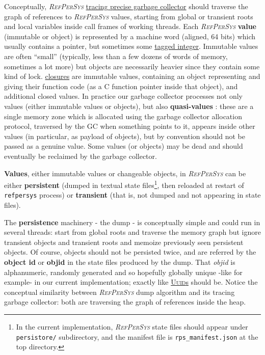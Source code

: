 \documentclass{IEEEtran}
\newcommand{\RefPerSys}{{\textit{\textsc{RefPerSys}}}}
\begin{document}
Conceptually, {\RefPerSys}
\href{https://en.wikipedia.org/wiki/Tracing_garbage_collection}{tracing
  precise garbage collector} should traverse the graph of references
to {\RefPerSys} values, starting from global or transient roots and
local variables inside call frames of working threads. Each
{\RefPerSys} \textbf{value}  (immutable or object) is
represented by a machine word (aligned, 64 bits) which usually
contains a pointer, but sometimes some
\href{https://en.wikipedia.org/wiki/Tagged\_pointer}{tagged integer}.
Immutable values are often ``small'' (typically, less than a few dozens of words of memory, sometimes a lot more) but
objects are necessarily heavier since they contain some kind of
lock. \href{https://en.wikipedia.org/wiki/Closure\_(computer_programming)}{closures}
are immutable values, containing an object representing and giving
their function code (as a C function pointer inside that object), and
additional closed values. In practice our garbage collector processes
not only values (either immutable values or objects), but also
\textbf{quasi-values} : these are a single memory
zone which is allocated using the garbage collector allocation
protocol, traversed by the GC when something points to it, appears
inside other values (in particular, as payload  of objects), but by
convention should not be passed as a genuine value.
Some values (or objects) may be dead and should eventually be reclaimed by the
garbage collector.

\textbf{Values}, either immutable values or changeable objects, in
       {\RefPerSys} can be either \textbf{persistent} (dumped in
       textual state files\footnote{In the current implementation,
       {\RefPerSys} state files should appear under
       \texttt{persistore/} subdirectory, and the manifest file is
       \texttt{rps\_manifest.json} at the top directory.}, then
       reloaded at restart of \texttt{refpersys} process) or
       \textbf{transient} (that is, not dumped and not appearing in
       state files).

The \textbf{persistence} machinery - the dump - is conceptually simple
and could run in several threads: start from global roots and traverse
the memory graph but ignore transient objects and transient roots and
memoize previously seen persistent objects. Of course, objects should
not be persisted twice, and are referred by the \textbf{object id} or
\textbf{objid} in the state files produced by the dump. That
\textit{objid}  is alphanumeric, randomly generated and so hopefully
globally unique -like {}
for example- in our current implementation; exactly like
\href{https://en.wikipedia.org/wiki/Universally_unique_identifier}{\textsc{Uuid}s}
should be. Notice the conceptual similarity between {\RefPerSys} dump
algorithm and its tracing garbage collector: both are traversing the
graph of references inside the heap.
\end{document}
